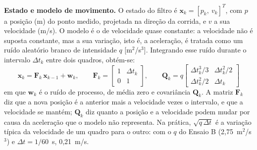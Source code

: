 \documentclass[
    12pt,               %
    openright,          %
    twoside,            %
    a4paper,            %
    chapter=TITLE,      %
    english,            %
    brazil              %
    ]{abntex2}
\begin{document}
\textbf{Estado e modelo de movimento.} O estado do filtro é $\mathbf{x}_k = [p_k,\ v_k]^T$, com $p$ a posição (m) do ponto medido, projetada na direção da corrida, e $v$ a sua velocidade (m/s). O modelo é o de velocidade quase constante: a velocidade não é suposta constante, mas a sua variação, isto é, a aceleração, é tratada como um ruído aleatório branco de intensidade $q$ [m$^2$/s$^3$]. Integrando esse ruído durante o intervalo $\Delta t_k$ entre dois quadros, obtém-se:
\begin{equation} \label{eq:kalman_modelo}
    \mathbf{x}_k = \mathbf{F}_k\,\mathbf{x}_{k-1} + \mathbf{w}_k, \qquad
    \mathbf{F}_k = \begin{bmatrix} 1 & \Delta t_k \\ 0 & 1 \end{bmatrix}, \qquad
    \mathbf{Q}_k = q \begin{bmatrix} \Delta t_k^3/3 & \Delta t_k^2/2 \\ \Delta t_k^2/2 & \Delta t_k \end{bmatrix}
\end{equation}
em que $\mathbf{w}_k$ é o ruído de processo, de média zero e covariância $\mathbf{Q}_k$. A matriz $\mathbf{F}_k$ diz que a nova posição é a anterior mais a velocidade vezes o intervalo, e que a velocidade se mantém; $\mathbf{Q}_k$ diz quanto a posição e a velocidade podem mudar por causa da aceleração que o modelo não representa. Na prática, $\sqrt{q\,\Delta t}$ é a variação típica da velocidade de um quadro para o outro: com o $q$ do Ensaio B (2,75~m$^2$/s$^3$) e $\Delta t = 1/60$~s, 0,21~m/s.
\end{document}
